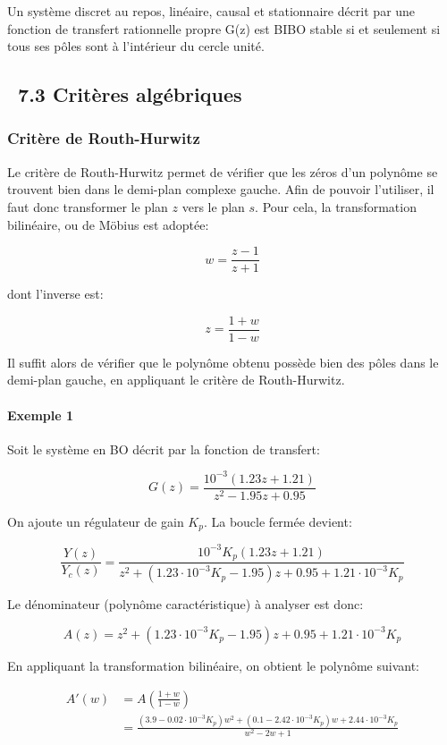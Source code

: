 \documentclass[11pt]{article}
\begin{document}
Un système discret au repos, linéaire, causal et stationnaire décrit par
une fonction de transfert rationnelle propre G(z) est BIBO stable si et
seulement si tous ses pôles sont à l'intérieur du cercle unité.

    \subsection{~7.3 Critères algébriques}\label{crituxe8res-alguxe9briques}

    \subsubsection{Critère de
Routh-Hurwitz}\label{crituxe8re-de-routh-hurwitz}

    Le critère de Routh-Hurwitz permet de vérifier que les zéros d'un
polynôme se trouvent bien dans le demi-plan complexe gauche. Afin de
pouvoir l'utiliser, il faut donc transformer le plan \(z\) vers le plan
\(s\). Pour cela, la transformation bilinéaire, ou de Möbius est
adoptée:

\[ w = \frac{z-1}{z+1} \]

dont l'inverse est:

\[ z = \frac{1+w}{1-w} \]

    Il suffit alors de vérifier que le polynôme obtenu possède bien des
pôles dans le demi-plan gauche, en appliquant le critère de
Routh-Hurwitz.

    \paragraph{Exemple 1}\label{exemple-1}

Soit le système en BO décrit par la fonction de transfert:

\[ G(z) = \frac{10^{-3}(1.23z+1.21)}{z^2-1.95z+0.95} \]

    On ajoute un régulateur de gain \(K_p\). La boucle fermée devient:

\[ \frac{Y(z)}{Y_c(z)} = \frac{10^{-3}K_p(1.23z+1.21)}{z^2+(1.23\cdot 10^{-3}K_p-1.95)z+0.95+1.21\cdot 10^{-3}K_p} \]

    Le dénominateur (polynôme caractéristique) à analyser est donc:

\[ A(z) = z^2+(1.23\cdot 10^{-3}K_p-1.95)z+0.95+1.21\cdot 10^{-3}K_p \]

    En appliquant la transformation bilinéaire, on obtient le polynôme
suivant:

\begin{align}
  A'(w) &= A\left(\frac{1+w}{1-w}\right) \\
  &= \frac{(3.9-0.02\cdot 10^{-3}K_p)w^2+(0.1-2.42\cdot 10^{-3}K_p)w+2.44\cdot 10^{-3}K_p}{w^2-2w+1}
\end{align}
\end{document}
